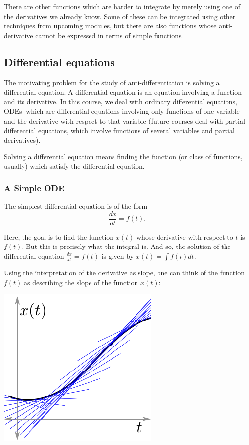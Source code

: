\documentclass[twoside,openright,titlepage,a4paper]{book}
\begin{document}
\begin{sloppypar}
There are other functions which are harder to integrate by merely using one of the derivatives we already know. Some of these can be integrated using other techniques from upcoming modules, but there are also functions whose anti-derivative cannot be expressed in terms of simple functions.

\subsection{Differential equations}

The motivating problem for the study of anti-differentiation is solving a differential equation. A differential equation is an equation involving a function and its derivative. In this course, we deal with ordinary differential equations, ODEs, which are differential equations involving only functions of one variable and the derivative with respect to that variable (future courses deal with partial differential equations, which involve functions of several variables and partial derivatives).

Solving a differential equation means finding the function (or class of functions, usually) which satisfy the differential equation.

\subsubsection{A Simple ODE}

The simplest differential equation is of the form \[ \frac{dx}{dt} = f(t). \]

Here, the goal is to find the function $x(t)$ whose derivative with respect to $t$ is $f(t)$. But this is precisely what the integral is. And so, the solution of the differential equation $\frac{dx}{dt} = f(t)$ is given by $x(t) = \int f(t)dt$.

Using the interpretation of the derivative as slope, one can think of the function $f(t)$ as describing the slope of the function $x(t)$:
\begin{center}\includegraphics[scale=0.6]{ODESlope}\end{center}


\end{sloppypar}
\end{document}
